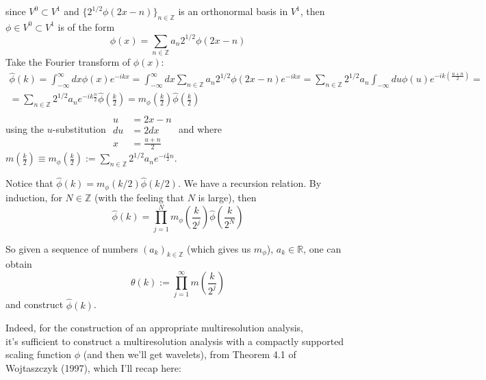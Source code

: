 \documentclass[twoside]{amsart}
\theoremstyle{plain}
\theoremstyle{definition}
\theoremstyle{remark}
\numberwithin{equation}{section}
\begin{document}
since $V^0 \subset V^1$ and $\lbrace 2^{1/2}\phi(2x - n) \rbrace_{n\in \mathbb{Z}}$ is an orthonormal basis in $V^1$, then $\phi \in V^0 \subset V^1$ is of the form
\[
\phi(x) = \sum_{n\in \mathbb{Z}} a_n 2^{1/2} \phi(2x-n)
\]
Take the Fourier transform of $\phi(x)$:
\[
\begin{gathered}
  \widehat{\phi}(k) = \int_{-\infty}^{\infty} dx \phi(x) e^{-ikx} = \int_{-\infty}^{\infty} dx \sum_{n \in \mathbb{Z}} a_n 2^{1/2} \phi(2x-n) e^{-ikx} = \sum_{n\in \mathbb{Z}} 2^{1/2} a_n \int_{-\infty} du \phi(u) e^{-ik (\frac{u+n}{2}  ) }= \\
  = \sum_{n\in \mathbb{Z}}2^{1/2} a_n e^{-ik \frac{n}{2} }\widehat{\phi}\left( \frac{k}{2} \right) = m_{\phi}\left( \frac{k}{2} \right) \widehat{\phi}\left( \frac{k}{2} \right)
\end{gathered}
\]
using the $u$-substitution $\begin{aligned} & \quad \\
  u  & = 2x - n \\
  du & = 2dx \\
  x & = \frac{u+n}{2} \end{aligned}$ and where $m\left( \frac{k}{2} \right) \equiv m_{\phi}\left( \frac{k}{2} \right) := \sum_{n\in \mathbb{Z}}2^{1/2} a_n e^{-i \frac{k}{2} n }$.  

Notice that $\widehat{\phi}(k) = m_{\phi}(k/2)\widehat{\phi}(k/2)$.  We have a recursion relation.  By induction, for $N \in \mathbb{Z}$ (with the feeling that $N$ is large), then 
\[
\widehat{\phi}(k) = \prod_{j=1}^N m_{\phi}\left( \frac{k}{2^j} \right) \widehat{\phi}\left( \frac{k}{2^N}  \right)
\]

So given a sequence of numbers $(a_k)_{k\in \mathbb{Z}}$ (which gives us $m_{\phi}$), $a_k \in \mathbb{R}$, one can obtain 
\[
\theta(k) := \prod_{j=1}^{\infty} m\left( \frac{k}{2^j} \right)
\]
and construct $\widehat{\phi}(k)$.  

Indeed, for the construction of an appropriate multiresolution analysis, \\
\phantom{Indeed, for} it's sufficient to construct a multiresolution analysis with a compactly supported scaling function $\phi$ (and then we'll get wavelets), from Theorem 4.1 of Wojtaszczyk (1997)\cite{PWojtaszczyk1997}, which I'll recap here:
\end{document}
